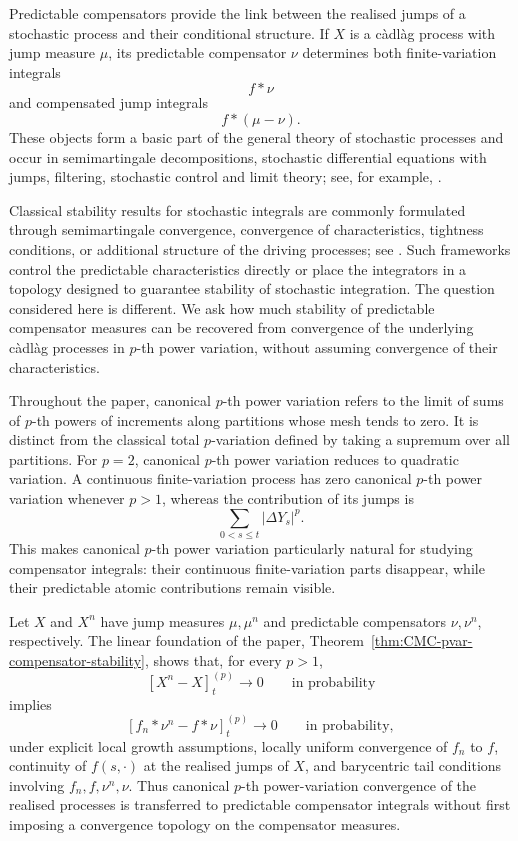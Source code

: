 \documentclass[a4paper,10pt]{article}
\begin{document}
Predictable compensators provide the link between the realised jumps of
a stochastic process and their conditional structure. If \(X\) is a
càdlàg process with jump measure \(\mu\), its predictable compensator
\(\nu\) determines both finite-variation integrals
\[
        f*\nu
\]
and compensated jump integrals
\[
        f*(\mu-\nu).
\]
These objects form a basic part of the general theory of stochastic
processes and occur in semimartingale decompositions, stochastic
differential equations with jumps, filtering, stochastic control and
limit theory; see, for example,
\cite{MeyerBook,JacodShiryaev,HeWangYan,IkedaWatanabe,Protter}.

Classical stability results for stochastic integrals are commonly
formulated through semimartingale convergence, convergence of
characteristics, tightness conditions, or additional structure of the
driving processes; see
\cite{KurtzProtter,Memin,LiptserShiryaev,Protter}. Such frameworks
control the predictable characteristics directly or place the
integrators in a topology designed to guarantee stability of stochastic
integration. The question considered here is different. We ask how much
stability of predictable compensator measures can be recovered from
convergence of the underlying càdlàg processes in \(p\)-th power
variation, without assuming convergence of their characteristics.

Throughout the paper, canonical \(p\)-th power variation refers to the
limit of sums of \(p\)-th powers of increments along partitions whose
mesh tends to zero. It is distinct from the classical total
\(p\)-variation defined by taking a supremum over all partitions. For
\(p=2\), canonical \(p\)-th power variation reduces to quadratic
variation. A continuous finite-variation process has zero canonical
\(p\)-th power variation whenever \(p>1\), whereas the contribution of
its jumps is
\[
        \sum_{0<s\le t}|\Delta Y_s|^p.
\]
This makes canonical \(p\)-th power variation particularly natural for
studying compensator integrals: their continuous finite-variation
parts disappear, while their predictable atomic contributions remain
visible.

Let \(X\) and \(X^n\) have jump measures \(\mu,\mu^n\) and predictable
compensators \(\nu,\nu^n\), respectively. The linear foundation of the
paper, Theorem~\ref{thm:CMC-pvar-compensator-stability}, shows that, for every \(p>1\),
\[
        [X^n-X]^{(p)}_t
        \longrightarrow0
        \qquad\text{in probability}
\]
implies
\[
        [f_n*\nu^n-f*\nu]^{(p)}_t
        \longrightarrow0
        \qquad\text{in probability},
\]
under explicit local growth assumptions, locally uniform convergence
of \(f_n\) to \(f\), continuity of \(f(s,\cdot)\) at the realised
jumps of \(X\), and barycentric tail conditions involving
\(f_n,f,\nu^n,\nu\). Thus canonical \(p\)-th power-variation
convergence of the realised processes is transferred to predictable
compensator integrals without first imposing a convergence topology on
the compensator measures.
\end{document}
